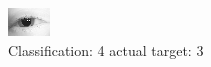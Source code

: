 \begin{figure}[h!]
\begin{center}
\includegraphics[width=0.60\columnwidth]{figures/ID45_class_4_target_3.png}
\end{center}
\caption{ Classification: 4 actual target: 3}
\label{fig:ID45_class_4_target_3}
\end{figure}
